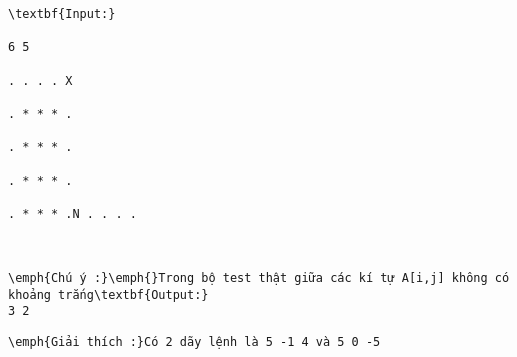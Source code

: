 \begin{verbatim}
\textbf{Input:}

6 5

. . . . X

. * * * .

. * * * .

. * * * .

. * * * .N . . . .\end{verbatim}
\begin{verbatim}


\emph{Chú ý :}\emph{}Trong bộ test thật giữa các kí tự A[i,j] không có khoảng trắng\textbf{Output:}
3 2\end{verbatim}
\begin{verbatim}
\emph{Giải thích :}Có 2 dãy lệnh là 5 -1 4 và 5 0 -5\end{verbatim}